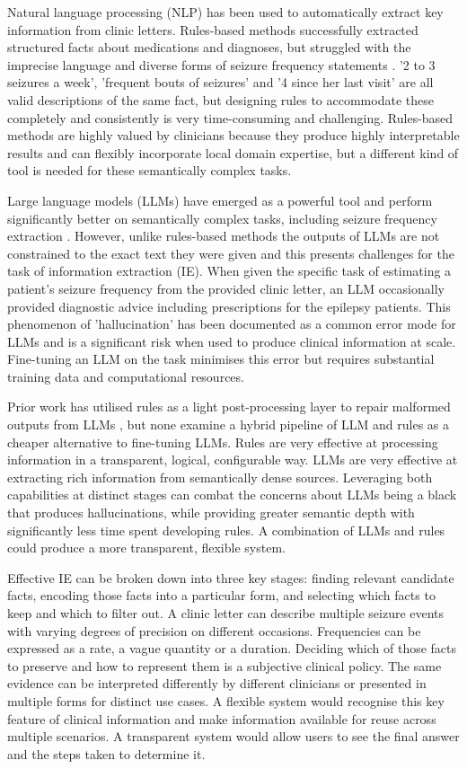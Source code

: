 \documentclass[conference]{IEEEtran}
\begin{document}
Natural language processing (NLP) has been used to 
automatically extract key information from clinic letters. 
Rules-based methods successfully extracted structured 
facts about medications and diagnoses, but struggled
with the imprecise language and diverse forms of seizure 
frequency statements \cite{b3}. '2 to 3 seizures a week', 
'frequent bouts of seizures' and '4 since her last visit' are 
all valid descriptions of the same fact, but designing 
rules to accommodate these completely and consistently
is very time-consuming and challenging. Rules-based 
methods are highly valued by clinicians because they
produce highly interpretable results and can flexibly 
incorporate local domain expertise, but a different
kind of tool is needed for these semantically complex 
tasks.

Large language models (LLMs) have emerged as a 
powerful tool and perform significantly better on semantically
complex tasks, including seizure frequency extraction \cite{b4}. 
However, unlike rules-based methods the outputs of 
LLMs are not constrained to the exact text they were
given and this presents challenges for the task of 
information extraction (IE). When given the specific 
task of estimating a patient's seizure frequency from 
the provided clinic letter, an LLM occasionally provided 
diagnostic advice including prescriptions for the epilepsy 
patients. This phenomenon of 'hallucination' has been
documented as a common error mode for LLMs and
is a significant risk when used to produce clinical 
information at scale. Fine-tuning an LLM on the task 
minimises this error but requires substantial training data
and computational resources. 

Prior work has utilised rules as a light post-processing
layer to repair malformed outputs from LLMs \cite{b5}, but 
none examine a hybrid pipeline of LLM and rules as a cheaper alternative to 
fine-tuning LLMs. Rules are very effective at processing 
information in a transparent, logical, configurable way. 
LLMs are very effective at extracting rich information from
semantically dense sources. Leveraging both capabilities
at distinct stages can combat the concerns about LLMs
being a black that produces hallucinations, while providing
greater semantic depth with significantly less time spent
developing rules. A combination of LLMs and rules could 
produce a more transparent, flexible system.

Effective IE can be broken down into three key stages: 
finding relevant candidate facts, encoding those facts into 
a particular form, and selecting which facts to keep and 
which to filter out. A clinic letter can describe multiple 
seizure events with varying degrees of precision 
on different occasions. Frequencies can be expressed as a 
rate, a vague quantity or a duration. Deciding which of 
those facts to preserve and how to represent them is a 
subjective clinical policy. The same evidence can be 
interpreted differently by different clinicians or presented 
in multiple forms for distinct use cases. A flexible system 
would recognise this key feature of clinical information 
and make information available for reuse across multiple 
scenarios. A transparent system would allow users to 
see the final answer and the steps taken to determine it. 
\end{document}

